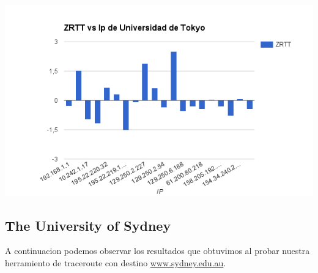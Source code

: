 \begin{center}
\includegraphics[width=\textwidth]{imgs/tokyo.png}
\end{center}


\subsection{The University of Sydney}
A continuacion podemos observar los resultados que obtuvimos al probar nuestra herramiento de traceroute
con destino \url{www.sydney.edu.au}.


